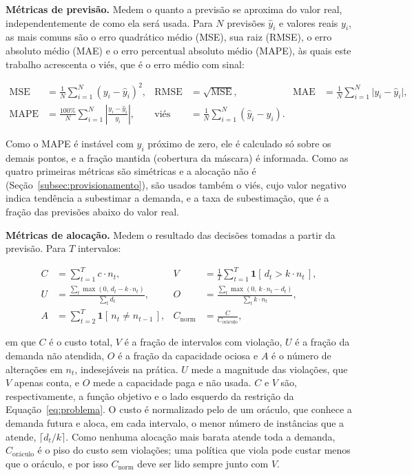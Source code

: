 \textbf{Métricas de previsão.} Medem o quanto a previsão se aproxima do valor real, independentemente de como ela será usada. Para $N$ previsões $\hat{y}_i$ e valores reais $y_i$, as mais comuns são o erro quadrático médio (MSE), sua raiz (RMSE), o erro absoluto médio (MAE) e o erro percentual absoluto médio (MAPE), às quais este trabalho acrescenta o viés, que é o erro médio com sinal:

\begin{align}
\mathrm{MSE} &= \frac{1}{N}\sum_{i=1}^{N}(y_i - \hat{y}_i)^2, &
\mathrm{RMSE} &= \sqrt{\mathrm{MSE}}, &
\mathrm{MAE} &= \frac{1}{N}\sum_{i=1}^{N}\lvert y_i - \hat{y}_i \rvert, \nonumber\\
\mathrm{MAPE} &= \frac{100\%}{N}\sum_{i=1}^{N}\left\lvert \frac{y_i - \hat{y}_i}{y_i} \right\rvert, &
\text{viés} &= \frac{1}{N}\sum_{i=1}^{N}(\hat{y}_i - y_i). && \label{eq:metricas-previsao}
\end{align}

\noindent Como o MAPE é instável com $y_i$ próximo de zero, ele é calculado só sobre os demais pontos, e a fração mantida (cobertura da máscara) é informada. Como as quatro primeiras métricas são simétricas e a alocação não é (Seção~\ref{subsec:provisionamento}), são usados também o viés, cujo valor negativo indica tendência a subestimar a demanda, e a taxa de subestimação, que é a fração das previsões abaixo do valor real.

\textbf{Métricas de alocação.} Medem o resultado das decisões tomadas a partir da previsão. Para $T$ intervalos:

\begin{align}
  C &= \sum_{t=1}^{T} c \cdot n_t, &
  V &= \frac{1}{T}\sum_{t=1}^{T} \mathbf{1}\left[\, d_t > k \cdot n_t \,\right], \nonumber\\
  U &= \frac{\sum_{t} \max(0,\, d_t - k \cdot n_t)}{\sum_{t} d_t}, &
  O &= \frac{\sum_{t} \max(0,\, k \cdot n_t - d_t)}{\sum_{t} k \cdot n_t}, \nonumber\\
  A &= \sum_{t=2}^{T} \mathbf{1}\left[\, n_t \neq n_{t-1} \,\right], &
  C_{\mathrm{norm}} &= \frac{C}{C_{\text{oráculo}}}, \label{eq:metricas-alocacao}
\end{align}

\noindent em que $C$ é o custo total, $V$ é a fração de intervalos com violação, $U$ é a fração da demanda não atendida, $O$ é a fração da capacidade ociosa e $A$ é o número de alterações em $n_t$, indesejáveis na prática. $U$ mede a magnitude das violações, que $V$ apenas conta, e $O$ mede a capacidade paga e não usada. $C$ e $V$ são, respectivamente, a função objetivo e o lado esquerdo da restrição da Equação~\ref{eq:problema}. O custo é normalizado pelo de um oráculo, que conhece a demanda futura e aloca, em cada intervalo, o menor número de instâncias que a atende, $\lceil d_t / k \rceil$. Como nenhuma alocação mais barata atende toda a demanda, $C_{\text{oráculo}}$ é o piso do custo sem violações; uma política que viola pode custar menos que o oráculo, e por isso $C_{\mathrm{norm}}$ deve ser lido sempre junto com $V$.

